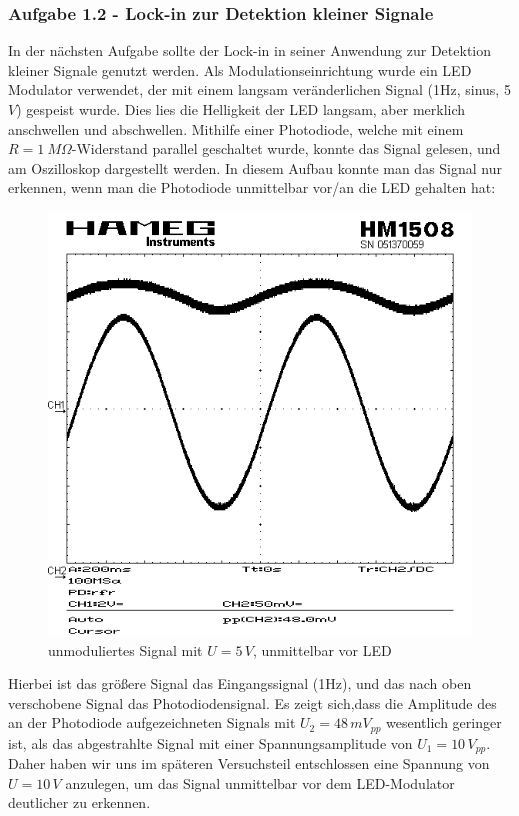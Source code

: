 \documentclass{scrartcl}						%
\begin{document}
			\subsubsection{Aufgabe 1.2 - Lock-in zur Detektion kleiner Signale}
			In der nächsten Aufgabe sollte der Lock-in in seiner Anwendung zur Detektion kleiner Signale genutzt werden. Als Modulationseinrichtung wurde ein LED Modulator verwendet, der mit einem langsam veränderlichen Signal (1Hz, sinus, 5$ V $) gespeist wurde. Dies lies die Helligkeit der LED langsam, aber merklich anschwellen und abschwellen. Mithilfe einer Photodiode, welche mit einem $ R=1 \ M\Omega $-Widerstand parallel geschaltet wurde, konnte das Signal gelesen, und am Oszilloskop dargestellt werden. In diesem Aufbau konnte man das Signal nur erkennen, wenn man die Photodiode unmittelbar vor/an die LED gehalten hat:\\
			\begin{figure}[h!b!]
				\centering
				\includegraphics[scale=0.40]{Signal-unmoduliert}
				\caption{unmoduliertes Signal mit $U=5\, V $, unmittelbar vor LED}
			\end{figure}
			Hierbei ist das größere Signal das Eingangssignal (1Hz), und das nach oben verschobene Signal das Photodiodensignal. Es zeigt sich,dass die Amplitude des an der Photodiode aufgezeichneten Signals mit $ U_2= 48\,mV_{pp}$ wesentlich geringer ist, als das abgestrahlte Signal mit einer Spannungsamplitude von $ U_1=10 \, V_{pp} $. Daher haben wir uns im späteren Versuchsteil entschlossen eine Spannung von $U=10\,V$ anzulegen, um das Signal unmittelbar vor dem LED-Modulator deutlicher zu erkennen.\\
\end{document}
